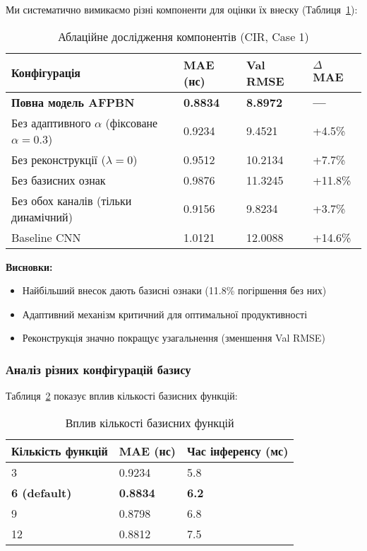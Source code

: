 \documentclass[12pt,a4paper]{article}
\begin{document}
Ми систематично вимикаємо різні компоненти для оцінки їх внеску (Таблиця~\ref{tab:ablation_study}):

\begin{table}[htbp]
	\centering
	\caption{Аблаційне дослідження компонентів (CIR, Case 1)}
	\label{tab:ablation_study}
	\begin{tabular}{@{}p{6cm}lll@{}}
		\toprule
		\textbf{Конфігурація} & \textbf{MAE (нс)} & \textbf{Val RMSE} & \textbf{$\Delta$ MAE} \\
		\midrule
		\textbf{Повна модель AFPBN} & \textbf{0.8834} & \textbf{8.8972} & \textbf{—} \\
		Без адаптивного $\alpha$ (фіксоване $\alpha=0.3$) & 0.9234 & 9.4521 & +4.5\% \\
		Без реконструкції ($\lambda=0$) & 0.9512 & 10.2134 & +7.7\% \\
		Без базисних ознак & 0.9876 & 11.3245 & +11.8\% \\
		Без обох каналів (тільки динамічний) & 0.9156 & 9.8234 & +3.7\% \\
		Baseline CNN & 1.0121 & 12.0088 & +14.6\% \\
		\bottomrule
	\end{tabular}
\end{table}

\textbf{Висновки:}
\begin{itemize}
	\item Найбільший внесок дають базисні ознаки (11.8\% погіршення без них)
	\item Адаптивний механізм критичний для оптимальної продуктивності
	\item Реконструкція значно покращує узагальнення (зменшення Val RMSE)
\end{itemize}

\subsubsection{Аналіз різних конфігурацій базису}

Таблиця~\ref{tab:basis_configurations} показує вплив кількості базисних функцій:

\begin{table}[htbp]
	\centering
	\caption{Вплив кількості базисних функцій}
	\label{tab:basis_configurations}
	\begin{tabular}{@{}lll@{}}
		\toprule
		\textbf{Кількість функцій} & \textbf{MAE (нс)} & \textbf{Час інференсу (мс)} \\
		\midrule
		3 & 0.9234 & 5.8 \\
		\textbf{6 (default)} & \textbf{0.8834} & \textbf{6.2} \\
		9 & 0.8798 & 6.8 \\
		12 & 0.8812 & 7.5 \\
		\bottomrule
	\end{tabular}
\end{table}
\end{document}
